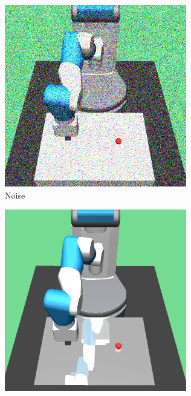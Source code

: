 \begin{figure}
  \begin{subfigure}{0.19\textwidth}
    \includegraphics[width=\textwidth]{figures/chapter6/test_observations/noise}
    \caption{Noise}
  \end{subfigure}
  \begin{subfigure}{0.19\textwidth}
    \includegraphics[width=\textwidth]{figures/chapter6/test_observations/reflection}

\end{subfigure}
\end{figure}
